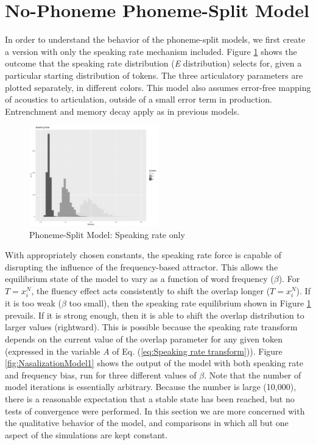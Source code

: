 \section{\label{sec:No-Phoneme-Phoneme-Split-Model}No-Phoneme Phoneme-Split
Model}

In order to understand the behavior of the phoneme-split models, we
first create a version with only the speaking rate mechanism included.
Figure \ref{fig:SpeakingRateOnly} shows the outcome that the speaking
rate distribution (\emph{E} distribution) selects for, given a particular
starting distribution of tokens. The three articulatory parameters
are plotted separately, in different colors. This model also assumes
error-free mapping of acoustics to articulation, outside of a small
error term in production. Entrenchment and memory decay apply as in
previous models.

\begin{figure}[h]
\includegraphics[width=0.5\textwidth]{figures/SpeakingRateI10000.pdf}\caption{\label{fig:SpeakingRateOnly}Phoneme-Split Model: Speaking rate only}
\end{figure}

With appropriately chosen constants, the speaking rate force is capable
of disrupting the influence of the frequency-based attractor. This
allows the equilibrium state of the model to vary as a function of
word frequency ($\beta$). For $T=x_{i}^{N}$, the fluency effect
acts consistently to shift the overlap longer ($T=x_{i}^{N}$). If
it is too weak ($\beta$ too small), then the speaking rate equilibrium
shown in Figure \ref{fig:SpeakingRateOnly} prevails. If it is strong
enough, then it is able to shift the overlap distribution to larger
values (rightward). This is possible because the speaking rate transform
depends on the current value of the overlap parameter for any given
token (expressed in the variable \emph{A} of Eq. (\ref{eq:Speaking rate transform})).
Figure \ref{fig:NasalizationModel1} shows the output of the model
with both speaking rate and frequency bias, run for three different
values of $\beta$. Note that the number of model iterations is essentially
arbitrary. Because the number is large (10,000), there is a reasonable
expectation that a stable state has been reached, but no tests of
convergence were performed. In this section we are more concerned
with the qualitative behavior of the model, and comparisons in which
all but one aspect of the simulations are kept constant.

